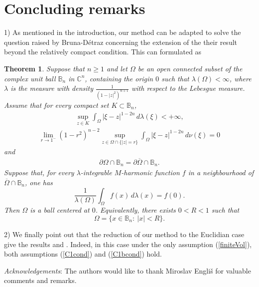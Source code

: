 \documentclass[12pt]{amsart}
\numberwithin{equation}{section}
\newcommand{\C}{{\mathbb C}}
\def\C{\mathbb{C}}
\newcommand{\BCn}{\mathbb B_n}
\newtheorem{theorem}{Theorem}
\theoremstyle{plain}
\numberwithin{equation}{section}
\numberwithin{theorem}{section}
\numberwithin{proposition}{section}
\begin{document}
\section{Concluding remarks} 1)  As mentioned in the introduction, our method can be adapted to solve the question raised by Bruna-D\'etraz \cite{BD} concerning the extension of the their result beyond the relatively compact condition. This can formulated as
\begin{theorem}\label{Mharmonic}
Suppose that $n\geq 1$ and let $\Omega$  be an open connected subset of  the complex unit ball $ \BCn$ in $\C^n$, containing the origin $0$ such that $\lambda(\Omega) <\infty$, where
$ \lambda$ is the measure with density $\frac{1}{(1-|z|^2)^{n+1}}$ with respect to the Lebesgue measure.
Assume that for every compact set \(K\subset\BCn\),
\begin{eqnarray}\label{MhC1cond}
\sup_{z\in K}
\int_\Omega |\xi-z|^{1-2n}\,d\lambda(\xi)
<+\infty,
\end{eqnarray}
\begin{eqnarray}\label{MhC1bcond}
\lim_{r\to1^-} (1-r^2)^{n-2}
\sup_{z\in\Omega\cap\{|z|=r\}}
\int_\Omega |\xi-z|^{1-2n}\,d\nu(\xi)=0
\end{eqnarray}
and
\begin{eqnarray}\label{MTopcond}
\partial\Omega\cap\BCn =\partial\overline{\Omega}\cap\BCn.
\end{eqnarray}
Suppose that, for every $\lambda$-integrable  \(M\)-harmonic function \(f\) in a neighbourhood of
\(\overline{\Omega} \cap\BCn\), one has
\[
\frac1{\lambda(\Omega)}\int_\Omega f(x)\,d\lambda(x)=f(0).
\]
Then \(\Omega\) is a ball centered at \(0\). Equivalently, there
exists \(0<R<1\) such that
\[
\Omega=\{x\in\BCn:\ |x|<R\}.
\]
\end{theorem}

2) We finally point out that the reduction of our method to the Euclidian case give the results \cite{AG} and \cite{Ku}. Indeed, in this case under the only assumption  (\ref{finiteVol}), both assumptions 
(\ref{C1cond}) and 
(\ref{C1bcond}) hold.

{\it Acknowledgements}: The authors would like to thank Miroslav Engli\v s for valuable comments and remarks.
\end{document}
